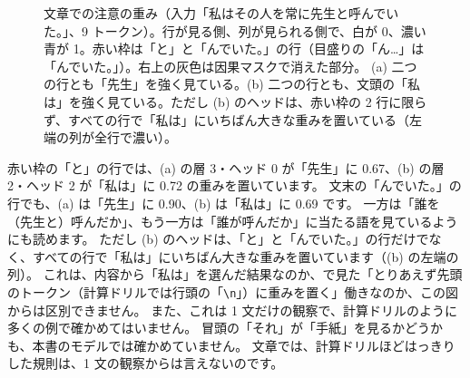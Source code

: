 \begin{figure}[tbp]
\centering
{}\hspace{4mm}%
\caption{文章での注意の重み（入力「私はその人を常に先生と呼んでいた。」、9 トークン）。行が見る側、列が見られる側で、白が 0、濃い青が 1。赤い枠は「と」と「んでいた。」の行（目盛りの「ん…」は「んでいた。」）。右上の灰色は因果マスクで消えた部分。
(a) 二つの行とも「先生」を強く見ている。(b) 二つの行とも、文頭の「私は」を強く見ている。ただし (b) のヘッドは、赤い枠の 2 行に限らず、すべての行で「私は」にいちばん大きな重みを置いている（左端の列が全行で濃い）。}
\label{fig:attn-heat-text}
\end{figure}

赤い枠の「と」の行では、(a) の層 3・ヘッド 0 が「先生」に 0.67、(b) の層 2・ヘッド 2 が「私は」に 0.72 の重みを置いています。
文末の「んでいた。」の行でも、(a) は「先生」に 0.90、(b) は「私は」に 0.69 です。
一方は「誰を（先生と）呼んだか」、もう一方は「誰が呼んだか」に当たる語を見ているようにも読めます。
ただし (b) のヘッドは、「と」と「んでいた。」の行だけでなく、すべての行で「私は」にいちばん大きな重みを置いています（(b) の左端の列）。
これは、内容から「私は」を選んだ結果なのか、で見た「とりあえず先頭のトークン（計算ドリルでは行頭の「\texttt{\textbackslash n}」）に重みを置く」働きなのか、この図からは区別できません。
また、これは 1 文だけの観察で、計算ドリルのように多くの例で確かめてはいません。
冒頭の「それ」が「手紙」を見るかどうかも、本書のモデルでは確かめていません。
文章では、計算ドリルほどはっきりした規則は、1 文の観察からは言えないのです。


